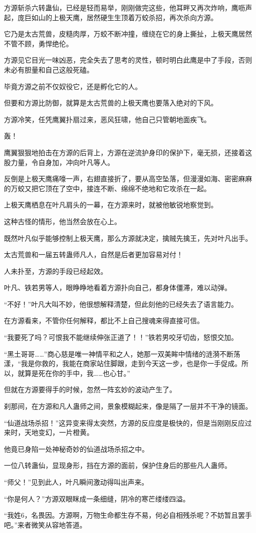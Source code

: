 \begin{this_body}
方源斩杀六转蛊仙，已经是轻而易举，刚刚做完这些，他耳畔又再次炸响，鹰呖声起，庞巨如山的上极天鹰，居然硬生生顶着万蛟杀招，再次杀向方源。

它乃是太古荒兽，皮糙肉厚，万蛟不断冲撞，缠绕在它的身上撕扯，上极天鹰居然不管不顾，勇悍绝伦。

方源见它目光一味凶恶，完全失去了思考的灵性，顿时明白此鹰是中了手段，否则未必有胆量和自己这般死磕。

毕竟方源之前不仅奴役它，还是孵化它的人。

但要和方源比防御，就算是太古荒兽的上极天鹰也要落入绝对的下风。

方源冷笑，任凭鹰翼扑扇过来，恶风狂啸，他自己只管朝地面疾飞。

轰！

鹰翼狠狠地拍击在方源的后背上，方源在逆流护身印的保护下，毫无损，还接着这股力量，令自身加，冲向叶凡等人。

反倒是上极天鹰痛嚎一声，右翅直接折了，要从高空坠落，但漫漫如海、密密麻麻的万蛟又把它顶在了空中，接连不断、绵绵不绝地和它攻杀在一起。

上极天鹰栖息在叶凡肩头的一幕，在方源来时，就被他敏锐地察觉到。

这种古怪的情形，他当然会放在心上。

既然叶凡似乎能够控制上极天鹰，那么方源就决定，擒贼先擒王，先对叶凡出手。

太古荒兽和一届五转蛊师凡人，自然是后者更加容易对付！

人未扑至，方源的手段已经起效。

叶凡、铁若男等人，眼睁睁地看着方源扑向自己，都身体僵滞，难以动弹。

“不好！”叶凡大叫不妙，他很想解释清楚，但此刻他的已经失去了语言能力。

在方源看来，不管你任何解释，都比不上自己搜魂来得直接可信。

“我要死了吗？可恨我不能继续伸张正道了！！”铁若男咬牙切齿，怒恨交加。

“黑土哥哥……”商心慈是唯一神情平和之人，她那一双美眸中情绪的涟漪不断荡漾，“我是你救的，我能在商家站住脚跟，走到今天这一步，也是你一手促成。所以，就算是死在你的手中，我……也心甘。”

但就在方源要得手的时候，忽然一阵玄妙的波动产生了。

刹那间，在方源和凡人蛊师之间，景象模糊起来，像是隔了一层并不干净的镜面。

“仙道战场杀招！”这异变来得太突然，方源的反应度是极快的，但是当刚刚反应过来时，天地变幻，一片橙黄。

他竟已身陷一处神秘奇妙的仙道战场杀招之中。

一位八转蛊仙，显现身形，挡在方源的面前，保护住身后的那些凡人蛊师。

“师父！”见到此人，叶凡瞬间激动得叫出声来。

“你是何人？”方源双眼眯成一条细缝，阴冷的寒芒缕缕四溢。

“我姓6，名畏因。方源啊，万物生命都生存不易，何必自相残杀呢？不妨暂且罢手吧。”来者微笑从容地答道。

\end{this_body}

